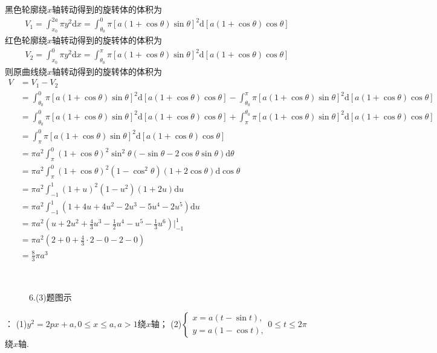 \documentclass[12pt,UTF8]{ctexart}
\begin{document}
\begin{enumerate}
黑色轮廓绕$x$轴转动得到的旋转体的体积为
\[\begin{split}
V_1=\int_{x_0}^{2a}\pi y^2\mathrm dx=\int_{\theta_0}^0\pi[a(1+\cos\theta)\sin\theta]^2\mathrm d[a(1+\cos\theta)\cos\theta]
\end{split}\]
红色轮廓绕$x$轴转动得到的旋转体的体积为
\[\begin{split}
V_2=\int_{x_0}^{0}\pi y^2\mathrm dx=\int_{\theta_0}^\pi\pi[a(1+\cos\theta)\sin\theta]^2\mathrm d[a(1+\cos\theta)\cos\theta]
\end{split}\]
则原曲线绕$x$轴转动得到的旋转体的体积为
\[\begin{split}
V&=V_1-V_2\\
&=\int_{\theta_0}^0\pi[a(1+\cos\theta)\sin\theta]^2\mathrm d[a(1+\cos\theta)\cos\theta]-\int_{\theta_0}^\pi\pi[a(1+\cos\theta)\sin\theta]^2\mathrm d[a(1+\cos\theta)\cos\theta]\\
&=\int_{\theta_0}^0\pi[a(1+\cos\theta)\sin\theta]^2\mathrm d[a(1+\cos\theta)\cos\theta]+\int_\pi^{\theta_0}\pi[a(1+\cos\theta)\sin\theta]^2\mathrm d[a(1+\cos\theta)\cos\theta]\\
&=\int_\pi^0\pi[a(1+\cos\theta)\sin\theta]^2\mathrm d[a(1+\cos\theta)\cos\theta]\\
&=\pi a^2\int_\pi^0(1+\cos\theta)^2\sin^2\theta(-\sin\theta-2\cos\theta\sin\theta)\mathrm d\theta\\
&=\pi a^2\int_\pi^0(1+\cos\theta)^2(1-\cos^2\theta)(1+2\cos\theta)\mathrm d\cos\theta\\
&=\pi a^2\int_{-1}^1(1+u)^2(1-u^2)(1+2u)\mathrm du\\
&=\pi a^2\int_{-1}^1(1+4u+4u^2-2u^3-5u^4-2u^5)\mathrm du\\
&=\pi a^2(u+2u^2+\frac43u^3-\frac12u^4-u^5-\frac13u^6)\Big|_{-1}^1\\
&=\pi a^2(2+0+\frac43\cdot2-0-2-0)\\
&=\frac83\pi a^3
\end{split}\]
\begin{figure}[H]
\begin{center}
    \\
\end{center}
\caption{6.(3)题图示}
\end{figure}
：
\newline
(1)$y^2=2px+a,0\leq x\leq a,a>1$绕$x$轴；
\newline
(2)$\begin{cases}
x=a(t-\sin t),\\
y=a(1-\cos t),
\end{cases}0\leq t\leq 2\pi$绕$x$轴.


\end{enumerate}
\end{document}
